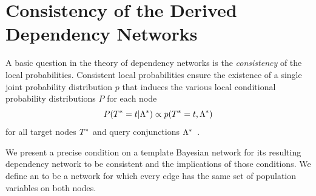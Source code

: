 \documentclass[runningheads,a4paper]{llncs}
\begin{document}
%
%
%
%

\section{Consistency of the Derived Dependency Networks} \label{sec:consistency} A basic question in the theory of dependency networks is the {\em consistency} of the local probabilities.  Consistent local probabilities ensure the existence of a single joint probability distribution $p$ that induces the various local conditional probability distributions $P$ for each node
$$P(T^{*}\hspace{0.0ex} = t | \Lambda^{*}\hspace{0.0ex}) \propto p(T^{*}\hspace{0.0ex} =t,\Lambda^{*}\hspace{0.0ex})$$  
for all target nodes $T^{*}\hspace{0.0ex}$ and query conjunctions $\Lambda^{*}\hspace{0.0ex}$~\cite{Heckerman2000}.

We present a precise condition on a template Bayesian network for its resulting dependency network to be consistent and the implications of those conditions.  We define an  to be a network for which every edge has the same set of population variables on both nodes.
\end{document}
